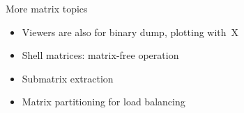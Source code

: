 \begin{longstory}
\begin{shortversion}
\begin{numberedframe}{More matrix topics}
  \begin{itemize}
  \item Viewers are also for binary dump, plotting with~X
  \item Shell matrices: matrix-free operation
  \item Submatrix extraction
  \item Matrix partitioning for load balancing
  \end{itemize}
\end{numberedframe}

\end{shortversion}

\end{longstory}
